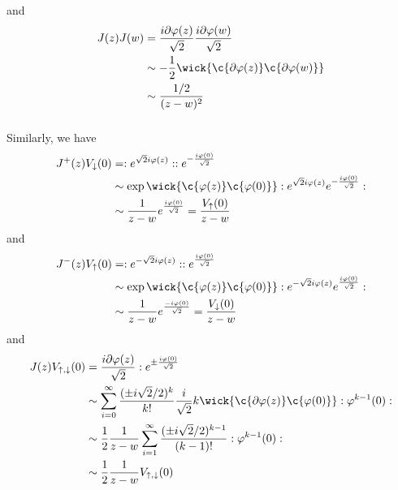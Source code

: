 and
\begin{equation}
	\begin{split}
	J(z)J(w) &= \frac{i \partial \varphi(z)}{\sqrt{2}}\frac{i \partial \varphi(w)}{\sqrt{2}}\\
	& \sim -\frac{1}{2} \wick{\c{\partial \varphi(z) } \c{\partial \varphi(w)} }\\
	& \sim \frac{1/2}{(z-w)^2}
	\end{split}
\end{equation}
\subsubsection{}
Similarly, we have 
\begin{equation}
	\begin{split}
	J^+ (z) V_\downarrow (0) & = : e^{\sqrt{2} i \varphi(z)}:: e^{- \frac{i \varphi(0)}{\sqrt{2}}}\\
	& \sim \exp{ \wick{\c{\varphi(z)} \c{\varphi(0)}}} : e^{\sqrt{2}i \varphi(z)} e^{-\frac{i \varphi(0)}{\sqrt{2}}}:\\
	&  \sim \frac{1}{z-w} e^{\frac{i \varphi(0)}{\sqrt{2}}} = \frac{V_{\uparrow}(0)}{z-w}
	\end{split}
\end{equation}
and 
\begin{equation}
\begin{split}
J^- (z) V_\uparrow (0) & = : e^{-\sqrt{2} i \varphi(z)}:: e^{\frac{i \varphi(0)}{\sqrt{2}}}\\
& \sim \exp{ \wick{\c{\varphi(z)} \c{\varphi(0)}}} : e^{-\sqrt{2}i \varphi(z)} e^{\frac{i \varphi(0)}{\sqrt{2}}}:\\
&  \sim \frac{1}{z-w} e^{\frac{-i \varphi(0)}{\sqrt{2}}} = \frac{V_{\downarrow}(0)}{z-w}
\end{split}
\end{equation}
and 
\begin{equation}
\begin{split}
J(z) V_{\uparrow,\downarrow}(0)& = \frac{i \partial \varphi(z)}{\sqrt{2}} :e^{\pm \frac{i \varphi(0)}{\sqrt{2}}}\\
&\sim \sum_{i=0}^{\infty} \frac{(\pm i\sqrt{2}/2)^k}{k!} \frac{i}{\sqrt{2}}k \wick{\c{\partial \varphi(z)} \c{\varphi(0)} }:\varphi^{k-1}(0):\\
& \sim \frac{1}{2}\frac{1}{z-w} \sum_{i=1}^{\infty} \frac{(\pm i \sqrt{2}/2)^{k-1}}{(k-1)!} : \varphi^{k-1}(0):\\
&\sim \frac{1}{2}\frac{1}{z-w} V_{\uparrow,\downarrow}(0)
\end{split}
\end{equation}
